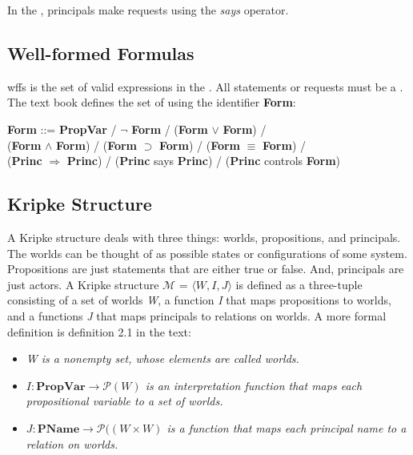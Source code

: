 \documentclass[../../main/main.tex]{subfiles}
\begin{document}
In the , principals make requests using the \textit{says} operator.  

\subsection{Well-formed Formulas}\label{ssec:wff}
\Glspl{wff} is the set of valid expressions in the .  All  statements or requests must be a .  The text book defines the set of  using the identifier \textbf{Form}:

\begin{center}
\textbf{Form} ::= \textbf{PropVar} / $\neg$ \textbf{Form} / (\textbf{Form} $\vee$ \textbf{Form}) / \\ 
	                  (\textbf{Form} $\wedge$ \textbf{Form}) / (\textbf{Form} $\supset$ \textbf{Form}) / (\textbf{Form} $\equiv$ \textbf{Form}) / \\
	                  (\textbf{Princ} $\Rightarrow$ \textbf{Princ}) / (\textbf{Princ} says \textbf{Princ}) / (\textbf{Princ} controls \textbf{Form})
\end{center}


\subsection{Kripke Structure}\label{ssec:kripke}
A Kripke structure deals with three things: worlds, propositions, and principals.  The worlds can be thought of as possible states or configurations of some system.  Propositions are just statements that are either true or false.  And, principals are just actors.  A Kripke structure $\mathcal{M}$ = $\langle \textit{W}, \textit{I}, \textit{J} \rangle $  is defined as a three-tuple consisting of a set of worlds \textit{W}, a function \textit{I} that maps propositions to worlds, and a functions \textit{J} that maps principals to relations on worlds.  A more formal definition is definition 2.1 in the text:

\begin{itemize}
\item \textit{W is a nonempty set, whose elements are called worlds.}
\item \textit{$I: \mathbf{PropVar} \rightarrow \mathcal{P}(W)$ is an interpretation function that maps each propositional variable to a set of worlds.}
\item \textit{$J: \mathbf{PName} \rightarrow \mathcal{P}((W \times W)$ is a function that maps each principal name to a relation on worlds.}
\end{itemize}
\end{document}
